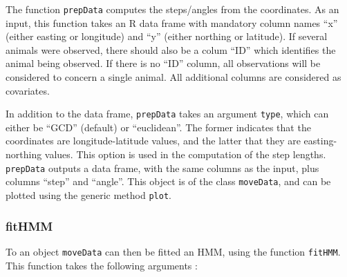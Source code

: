 \documentclass[]{article}
\begin{document}
The function \texttt{prepData} computes the steps/angles from the coordinates. As an input, this function takes an R data frame with mandatory column names ``x'' (either easting or longitude) and ``y'' (either northing or latitude). If several animals were observed, there should also be a colum ``ID'' which identifies the animal being observed. If there is no ``ID'' column, all observations will be considered to concern a single animal. All additional columns are considered as covariates.

In addition to the data frame, \texttt{prepData} takes an argument \texttt{type}, which can either be ``GCD'' (default) or ``euclidean''. The former indicates that the coordinates are longitude-latitude values, and the latter that they are easting-northing values. This option is used in the computation of the step lengths.\\

\texttt{prepData} outputs a data frame, with the same columns as the input, plus columns ``step'' and ``angle''. This object is of the class \texttt{moveData}, and can be plotted using the generic method \texttt{plot}.

\subsubsection{fitHMM}
To an object \texttt{moveData} can then be fitted an HMM, using the function \texttt{fitHMM}. This function takes the following arguments :
\end{document}

